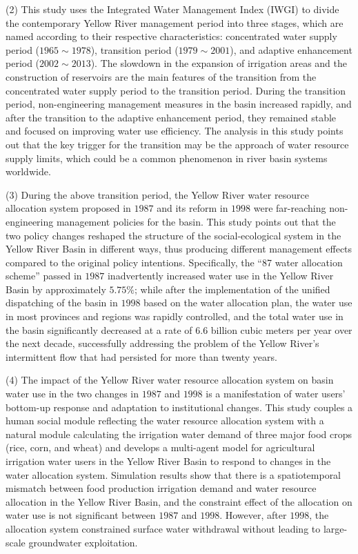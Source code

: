 \begin{eabstract}
  (2) This study uses the Integrated Water Management Index (IWGI) to divide the contemporary Yellow River management period into three stages, which are named according to their respective characteristics: concentrated water supply period ($1965 \sim 1978$), transition period ($1979 \sim 2001$), and adaptive enhancement period ($2002 \sim 2013$). The slowdown in the expansion of irrigation areas and the construction of reservoirs are the main features of the transition from the concentrated water supply period to the transition period. During the transition period, non-engineering management measures in the basin increased rapidly, and after the transition to the adaptive enhancement period, they remained stable and focused on improving water use efficiency. The analysis in this study points out that the key trigger for the transition may be the approach of water resource supply limits, which could be a common phenomenon in river basin systems worldwide.

  (3) During the above transition period, the Yellow River water resource allocation system proposed in $1987$ and its reform in $1998$ were far-reaching non-engineering management policies for the basin. This study points out that the two policy changes reshaped the structure of the social-ecological system in the Yellow River Basin in different ways, thus producing different management effects compared to the original policy intentions. Specifically, the ``87 water allocation scheme'' passed in $1987$ inadvertently increased water use in the Yellow River Basin by approximately $5.75\%$; while after the implementation of the unified dispatching of the basin in $1998$ based on the water allocation plan, the water use in most provinces and regions was rapidly controlled, and the total water use in the basin significantly decreased at a rate of $6.6$ billion cubic meters per year over the next decade, successfully addressing the problem of the Yellow River's intermittent flow that had persisted for more than twenty years.

  (4) The impact of the Yellow River water resource allocation system on basin water use in the two changes in $1987$ and $1998$ is a manifestation of water users' bottom-up response and adaptation to institutional changes. This study couples a human social module reflecting the water resource allocation system with a natural module calculating the irrigation water demand of three major food crops (rice, corn, and wheat) and develops a multi-agent model for agricultural irrigation water users in the Yellow River Basin to respond to changes in the water allocation system. Simulation results show that there is a spatiotemporal mismatch between food production irrigation demand and water resource allocation in the Yellow River Basin, and the constraint effect of the allocation on water use is not significant between $1987$ and $1998$. However, after $1998$, the allocation system constrained surface water withdrawal without leading to large-scale groundwater exploitation.


\end{eabstract}
